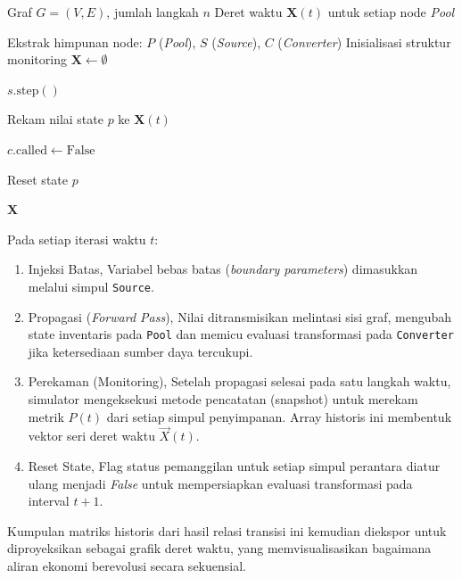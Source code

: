 \begin{algorithm}[h]
\caption{Simulasi Dinamika Aliran Graf Waktu Diskret}
\label{alg:graph-simulator}
\begin{algorithmic}[1]
\INPUT Graf $G = (V, E)$, jumlah langkah $n$ 
\OUTPUT Deret waktu $\mathbf{X}(t)$ untuk setiap node \textit{Pool}

\State Ekstrak himpunan node: $P$ (\textit{Pool}), $S$ (\textit{Source}), $C$ (\textit{Converter})
\State Inisialisasi struktur monitoring $\mathbf{X} \gets \emptyset$

        \State $s.\text{step}()$ 
    \EndFor
    
        \State Rekam nilai state $p$ ke $\mathbf{X}(t)$
    \EndFor
    
        \State $c.\text{called} \gets \text{False}$ 
    \EndFor
\EndFor

    \State Reset state $p$
\EndFor

\State \Return $\mathbf{X}$
\end{algorithmic}
\end{algorithm}

Pada setiap iterasi waktu $t$:

\begin{enumerate}
    \item Injeksi Batas, Variabel bebas batas (\textit{boundary parameters}) dimasukkan melalui simpul \texttt{Source}.
    \item Propagasi (\textit{Forward Pass}), Nilai ditransmisikan melintasi sisi graf, mengubah state inventaris pada \texttt{Pool} dan memicu evaluasi transformasi pada \texttt{Converter} jika ketersediaan sumber daya tercukupi.
    \item Perekaman (Monitoring), Setelah propagasi selesai pada satu langkah waktu, simulator mengeksekusi metode pencatatan (snapshot) untuk merekam metrik $P(t)$ dari setiap simpul penyimpanan. Array historis ini membentuk vektor seri deret waktu $\vec{X}(t)$.
    \item Reset State, Flag status pemanggilan untuk setiap simpul perantara diatur ulang menjadi \textit{False} untuk mempersiapkan evaluasi transformasi pada interval $t+1$.
\end{enumerate}

Kumpulan matriks historis dari hasil relasi transisi ini kemudian diekspor untuk diproyeksikan sebagai grafik deret waktu, yang memvisualisasikan bagaimana aliran ekonomi berevolusi secara sekuensial.

